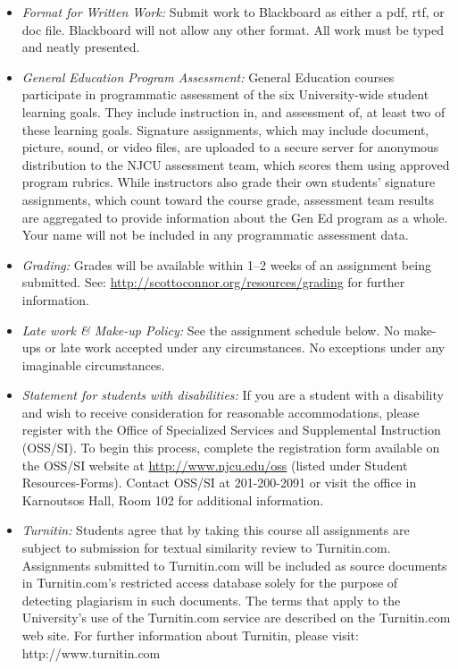 \documentclass[article,oneside]{memoir}
\begin{document}
\begin{itemize}
\item \textit{Format for Written Work:} Submit work to Blackboard as either a pdf, rtf, or doc file. Blackboard will not allow any other format. All work must be typed and neatly presented. 


\item \textit{General Education Program Assessment:} General Education courses participate in programmatic assessment of the six University-wide student learning goals. They include instruction in, and assessment of, at least two of these learning goals. Signature assignments, which may include document, picture, sound, or video files, are uploaded to a secure server for anonymous distribution to the NJCU assessment team, which scores them using approved program rubrics. While instructors also grade their own students’ signature assignments, which count toward the course grade, assessment team results are aggregated to provide information about the Gen Ed program as a whole. Your name will not be included in any programmatic assessment data.

\item \textit{Grading:} Grades will be available within 1--2 weeks of an assignment being submitted. See: \href{http://scottoconnor.org/resources/grading}{http://scottoconnor.org/resources/grading} for further information.


\item \textit{Late work \& Make-up Policy:} See the assignment schedule below. No make-ups or late work accepted under any circumstances. No exceptions under any imaginable circumstances.

\item \textit{Statement for students with disabilities:} If you are a student
with a disability and wish to receive consideration for reasonable
accommodations, please register with the Office of Specialized Services
and Supplemental Instruction (OSS/SI). To begin this process, complete
the registration form available on the OSS/SI website at
\href{http://www.njcu.edu/oss}{http://www.njcu.edu/oss}
(listed under Student Resources-Forms). Contact OSS/SI at 201-200-2091
or visit the office in Karnoutsos Hall, Room 102 for additional
information.

\item \textit{Turnitin:} Students agree that by taking this course all assignments are subject to submission for textual similarity review to Turnitin.com. Assignments submitted to Turnitin.com will be included as source documents in Turnitin.com's restricted access database solely for the purpose of detecting plagiarism in such documents.  The terms that apply to the University’s use of the Turnitin.com service are described on the Turnitin.com web site.  For further information about Turnitin, please visit: http://www.turnitin.com 


\end{itemize}
\end{document}
